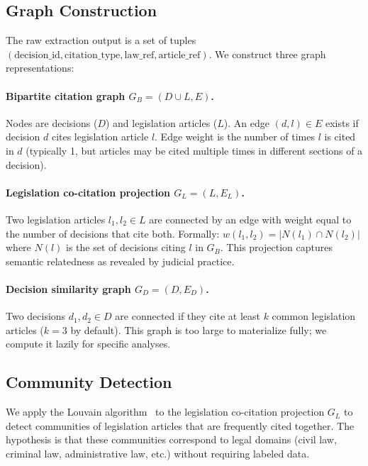 \documentclass[11pt]{article}
\begin{document}
\subsection{Graph Construction}
\label{sec:graph}

The raw extraction output is a set of tuples $(\text{decision\_id}, \text{citation\_type}, \text{law\_ref}, \text{article\_ref})$.
We construct three graph representations:

\paragraph{Bipartite citation graph $G_B = (D \cup L, E)$.}
Nodes are decisions ($D$) and legislation articles ($L$).
An edge $(d, l) \in E$ exists if decision $d$ cites legislation article $l$.
Edge weight is the number of times $l$ is cited in $d$ (typically 1, but articles may be cited multiple times in different sections of a decision).

\paragraph{Legislation co-citation projection $G_L = (L, E_L)$.}
Two legislation articles $l_1, l_2 \in L$ are connected by an edge with weight equal to the number of decisions that cite both.
Formally: $w(l_1, l_2) = |N(l_1) \cap N(l_2)|$ where $N(l)$ is the set of decisions citing $l$ in $G_B$.
This projection captures semantic relatedness as revealed by judicial practice.

\paragraph{Decision similarity graph $G_D = (D, E_D)$.}
Two decisions $d_1, d_2 \in D$ are connected if they cite at least $k$ common legislation articles ($k=3$ by default).
This graph is too large to materialize fully; we compute it lazily for specific analyses.

\subsection{Community Detection}
\label{sec:communities}

We apply the Louvain algorithm~\citep{blondel2008louvain} to the legislation co-citation projection $G_L$ to detect communities of legislation articles that are frequently cited together.
The hypothesis is that these communities correspond to legal domains (civil law, criminal law, administrative law, etc.) without requiring labeled data.
\end{document}
